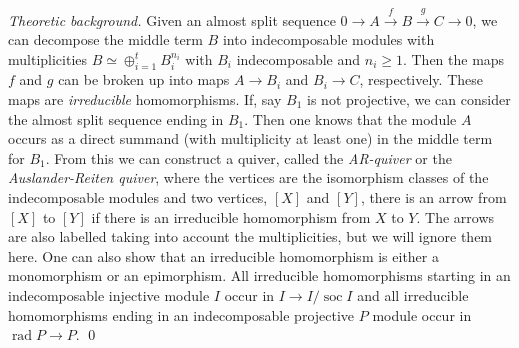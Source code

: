 \documentclass{amsart}
\newcommand{\rad}{\operatorname{rad}\nolimits}
\newcommand{\soc}{\operatorname{soc}\nolimits}
\theoremstyle{definition}
\theoremstyle{theoretic}
\newenvironment{theoback}
{\medskip\footnotesize\textit{Theoretic background.} }
{\qed\par\medskip}
\begin{document}
\begin{theoback}
  Given an almost split sequence $0\to A\xrightarrow{f}
  B\xrightarrow{g} C\to 0$, we can decompose the middle term $B$ into
  indecomposable modules with multiplicities $B \simeq \oplus_{i=1}^t
  B_i^{n_i}$ with $B_i$ indecomposable and $n_i\geqslant 1$.  Then the
  maps $f$ and $g$ can be broken up into maps $A\to B_i$ and $B_i\to
  C$, respectively.  These maps are \emph{irreducible} homomorphisms.
  If, say $B_1$ is not projective, we can consider the almost split
  sequence ending in $B_1$.  Then one knows that the module $A$ occurs
  as a direct summand (with multiplicity at least one) in the middle
  term for $B_1$.  From this we can construct a quiver, called the
  \emph{AR-quiver} or the \emph{Auslander-Reiten quiver}, where the
  vertices are the isomorphism classes of the indecomposable modules
  and two vertices, $[X]$ and $[Y]$, there is an arrow from $[X]$ to
  $[Y]$ if there is an irreducible homomorphism from $X$ to $Y$.  The
  arrows are also labelled taking into account the multiplicities, but
  we will ignore them here.  One can also show that an irreducible
  homomorphism is either a monomorphism or an epimorphism.  All
  irreducible homomorphisms starting in an indecomposable injective
  module $I$ occur in $I\to I/\soc I$ and all irreducible
  homomorphisms ending in an indecomposable projective $P$ module
  occur in $\rad P\to P$.
\end{theoback}
\end{document}
